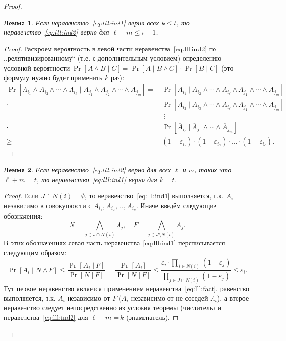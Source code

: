 \documentclass[12pt]{article}
\newcommand{\seqin}[3]{{#1}_{{#2}_1},{#1}_{{#2}_2},\dotsc,{#1}_{{#2}_{#3}}}
\theoremstyle{definition}
\theoremstyle{plain}
\newtheorem{lemma}{Лемма}[section]
\theoremstyle{remark}
\begin{document}
\begin{proof}
    \begin{lemma}\label{lm:lll:l1}
    Если неравенство~\eqref{eq:lll:ind1} верно всех $k \le t$, то неравенство~\eqref{eq:lll:ind2} верно для $\ell + m \le t + 1$. 
    \end{lemma}
    \begin{proof}
    Раскроем вероятность в левой части неравенства~\eqref{eq:lll:ind2} 
    по ,,релятивизированному`` (т.е. с дополнительным условием)
    определению условной вероятности $\Pr[A \land B\mid C] = \Pr[A \mid B \land C]\cdot \Pr[B\mid C]$
    (это формулу нужно будет применить $k$ раз):
    \[
        \begin{aligned}
        \Pr[\overline A_{i_1}\land \overline A_{i_2} \land\dotsb\land \overline A_{i_\ell} \mid 
            \overline A_{j_1}\land \overline A_{j_2} \land\dotsb\land \overline A_{j_m} ] =\,
        &\Pr[\overline A_{i_1} \mid \overline A_{i_2}\land\dotsb\land \overline A_{i_\ell}\land 
            \overline A_{j_1}\land \dotsb\land \overline A_{j_m} ]\\
        \cdot&\Pr[\overline A_{i_2} \mid \overline A_{i_3}\land\dotsb\land \overline A_{i_\ell}\land 
            \overline A_{j_1}\land \dotsb\land \overline A_{j_m} ]\\
        &\ \vdots\\
        \cdot&\Pr[\overline A_{i_\ell} \mid 
            \overline A_{j_1}\land \dotsb\land \overline A_{j_m} ]\\
        \ge\,&(1-\varepsilon_{i_i})\cdot(1-\varepsilon_{i_2})\cdot\dotso\cdot(1-\varepsilon_{i_\ell}).
        \end{aligned}
    \]
    \end{proof}


    \begin{lemma}\label{lm:lll:l2}
    Если неравенство~\eqref{eq:lll:ind2} верно для всех $\ell$ и $m$, таких что $\ell + m = t$, 
    то неравенство~\eqref{eq:lll:ind1} верно для $k = t$.
    \end{lemma}
    \begin{proof}
    Если $J\cap N(i) = \emptyset$, то неравенство~\eqref{eq:lll:ind1} выполняется, т.к. 
    $A_i$ независимо в совокупности с $\seqin{A}{i}{k}$. Иначе введём следующие обозначения:
    \[N = \bigwedge_{j\in J\cap N(i)} \overline A_j,\quad
      F = \bigwedge_{j\in J\setminus N(i)} \overline A_j.
    \]
    В этих обозначениях левая часть неравенства~\eqref{eq:lll:ind1} переписывается следующим образом:
    \[
    \Pr[A_i\mid N\land F ] 
        \le \frac{\Pr [A_i\mid F]}{\Pr[N\mid F]} 
        =   \frac{\Pr [A_i]}{\Pr[N\mid F]} 
        \le \frac{\varepsilon_i \cdot \prod_{j\in N(i)} (1-\varepsilon_j)}
                                     {\prod_{j\in J \cap N(i)} (1-\varepsilon_j)} \le \varepsilon_i.
    \]
    Тут первое неравенство является применением неравенства~\eqref{eq:lll:fact}, равенство выполняется,
    т.к. $A_i$ независимо от $F$ ($A_i$ независимо от не соседей $A_i$), а второе неравенство
    следует непосредственно из условия теоремы (числитель) и неравенства~\eqref{eq:lll:ind2} для $\ell + m = k$ (знаменатель).
    \end{proof}
    

\end{proof}
\end{document}
